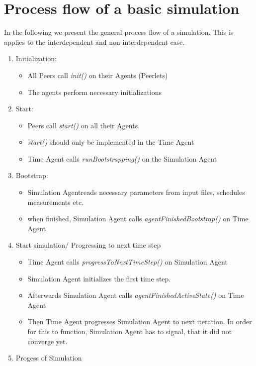 \documentclass[11pt,fleqn]{book} %
\newcommand{\MainAgent}{Simulation Agent}
\newcommand{\TimeAgent}{Time Agent}
\begin{document}
\section{Process flow of a basic simulation}
In the following we present the general process flow of a simulation. This is applies to the interdependent and non-interdependent case.
\begin{enumerate}
	\item Initialization:
	\begin{itemize}
		\item All Peers call \textit{init()} on their Agents (Peerlets)
		\item The agents perform necessary initializations
	\end{itemize}
	\item Start:
	\begin{itemize}
		\item Peers call \textit{start()} on all their Agents.
		\item \textit{start()} should only be implemented in the \TimeAgent{}
		\item \TimeAgent{} calls \textit{runBootstrapping()} on the \MainAgent{}
	\end{itemize}
	\item Bootstrap:
	\begin{itemize}
		\item \MainAgent reads necessary parameters from input files, schedules measurements etc.
		\item when finished, \MainAgent{} calls \textit{agentFinishedBootstrap()} on \TimeAgent{}
	\end{itemize}
	\item Start simulation/ Progressing to next time step
	\begin{itemize}
		\item \TimeAgent{} calls \textit{progressToNextTimeStep()} on \MainAgent
		\item \MainAgent{} initializes the first time step.
		\item Afterwards \MainAgent{} calls \textit{agentFinishedActiveState()} on \TimeAgent{}
		\item Then \TimeAgent{} progresses \MainAgent{} to next iteration. In order for this to function, \MainAgent{} has to signal, that it did not converge yet.
	\end{itemize}
	\item Progess of Simulation
	\begin{itemize}

\end{itemize}
\end{enumerate}
\end{document}
